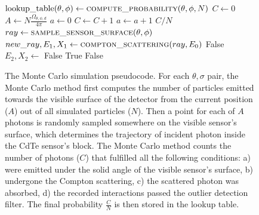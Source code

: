 
  \begin{figure}
\begin{algorithmic}
      \State $\mathrm{lookup\_table}(\theta, \phi) \gets \Call{compute\_probability}{\theta, \phi, N}$
    \EndFor
  \EndFor
\EndFunction
\Statex
{}
\State $C \gets 0$
\State $A \gets N\frac{\Omega_{\theta, \phi, d}}{4 \pi}$ 
\State $a \gets 0$
   
  \State $C \gets C + 1 $ 
  \EndIf
  \State $a \gets a + 1$
\EndWhile
  \State \Return $C/N$ 
  \EndFunction
\Statex
  \State $ray \gets \Call{sample\_sensor\_surface}{\theta,\phi}$ 
   
  \State $new\_ray, E_{1}, X_{1} \gets \Call{compton\_scattering}{ray, E_{0}}$ %
  \Else{}
    \State \Return False 
  \EndIf
    
    \State $E_{2}, X_{2} \gets $
  \Else{}
    \State \Return False
  \EndIf
    
    \State \Return True   
    \Else{}
    \State \Return False
  \EndIf
\EndFunction
\end{algorithmic}
      \caption{The Monte Carlo simulation pseudocode. For each $\theta, \sigma$ pair, the Monte Carlo method first computes the number of particles emitted towards the visible surface of the detector from the current position ($A$) out of all simulated particles ($N$). 
    Then a point for each of $A$ photons is randomly sampled somewhere on the visible sensor's surface, which determines the trajectory of incident photon inside the \ac{CdTe} sensor's block. 
    The Monte Carlo method counts the number of photons ($C$) that fulfilled all the following conditions: a) were emitted under the solid angle of the visible sensor's surface, 
    b) undergone the Compton scattering, 
    c) the scattered photon was absorbed, 
    d) the recorded interactions passed the outlier detection filter.
    The final probability $\frac{C}{N}$ is then stored in the lookup table.}
\label{alg:monte}
\end{figure}
\newpage
